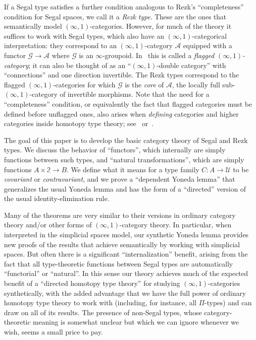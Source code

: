 \documentclass{amsart}
\theoremstyle{plain}
\theoremstyle{definition}
\theoremstyle{remark}
\numberwithin{equation}{section}
\newcommand{\univtype}{\mathcal{U}}
\newcommand{\two}{\mathbb{2}}
\begin{document}
If a Segal type satisfies a further condition analogous to Rezk's ``completeness'' condition for Segal spaces, we call it a \emph{Rezk type}.
These are the ones that semantically model $(\infty,1)$-categories.
However, for much of the theory it suffices to work with Segal types, which also have an $(\infty,1)$-categorical interpretation: they correspond to an $(\infty,1)$-category $\mathcal{A}$ equipped with a functor $\mathcal{G}\to \mathcal{A}$ where $\mathcal{G}$ is an $\infty$-groupoid.
In~\cite{fibrations} this is called a \emph{flagged $(\infty,1)$-category}; it can also be thought of as an ``$(\infty,1)$-double category'' with ``connections'' and one direction invertible.
The Rezk types correspond to the flagged $(\infty,1)$-categories for which $\mathcal{G}$ is the \emph{core} of $\mathcal{A}$, the locally full sub-$(\infty,1)$-category of invertible morphisms.
Note that the need for a ``completeness'' condition, or equivalently the fact that flagged categories must be defined before unflagged ones, also arises when \emph{defining} categories and higher categories inside homotopy type theory; see~\cite[Chapter 9]{hottbook} or~\cite{aks}.

The goal of this paper is to develop the basic category theory of Segal and Rezk types.
We discuss the behavior of ``functors'', which internally are simply functions between such types, and ``natural transformations'', which are simply functions $A\times \two\to B$.
We define what it means for a type family $C:A\to \univtype$ to be \emph{covariant} or \emph{contravariant}, and we prove a ``dependent Yoneda lemma'' that generalizes the usual Yoneda lemma and has the form of a ``directed'' version of the usual identity-elimination rule.

Many of the theorems are very similar to their versions in ordinary category theory and/or other forms of $(\infty,1)$-category theory.
In particular, when interpreted in the simplicial spaces model, our synthetic Yoneda lemma provides new proofs of the results that \cite{RV4,kv:yoneda-css,boavida:segr,rasekh:yoneda-ss} achieve semantically by working with simplicial spaces.
But often there is a significant ``internalization'' benefit, arising from the fact that all type-theoretic functions between Segal types are automatically ``functorial'' or ``natural''.
In this sense our theory achieves much of the expected benefit of a ``directed homotopy type theory'' for studying $(\infty,1)$-categories synthetically, with the added advantage that we have the full power of ordinary homotopy type theory to work with (including, for instance, all $\Pi$-types) and can draw on all of its results.
The presence of non-Segal types, whose category-theoretic meaning is somewhat unclear but which we can ignore whenever we wish, seems a small price to pay.
\end{document}
